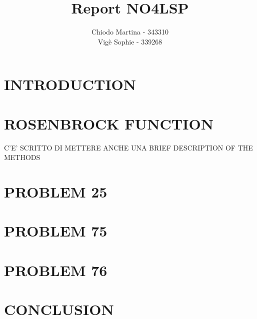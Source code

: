 \documentclass{article}
\title{Report NO4LSP}
\author{Chiodo Martina - 343310 \\ Vigè Sophie - 339268}
\date{}
\begin{document}
%



\section*{INTRODUCTION}


\clearpage
\section*{ROSENBROCK FUNCTION}


\clearpage
C'E' SCRITTO DI METTERE ANCHE UNA BRIEF DESCRIPTION OF THE METHODS

\clearpage
\section*{PROBLEM 25}


\clearpage
\section*{PROBLEM 75}


\clearpage
\section*{PROBLEM 76}


\clearpage
\section*{CONCLUSION}

\end{document}
